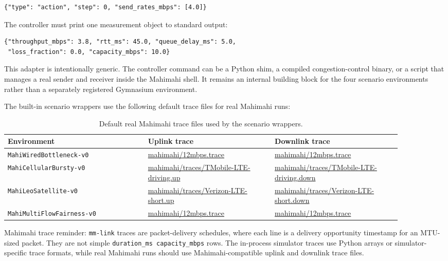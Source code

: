 \documentclass[11pt]{article}
\begin{document}
\begin{verbatim}
{"type": "action", "step": 0, "send_rates_mbps": [4.0]}
\end{verbatim}

The controller must print one measurement object to standard output:

\begin{verbatim}
{"throughput_mbps": 3.8, "rtt_ms": 45.0, "queue_delay_ms": 5.0,
 "loss_fraction": 0.0, "capacity_mbps": 10.0}
\end{verbatim}

This adapter is intentionally generic. The controller command can be a Python
shim, a compiled congestion-control binary, or a script that manages a real
sender and receiver inside the Mahimahi shell. It remains an internal building
block for the four scenario environments rather than a separately registered
Gymnasium environment.

The built-in scenario wrappers use the following default trace files for real
Mahimahi runs:

\begin{table}[h]
\centering
\small
\begin{tabular}{p{0.31\linewidth}p{0.29\linewidth}p{0.29\linewidth}}
\toprule
Environment & Uplink trace & Downlink trace \\
\midrule
\texttt{MahiWiredBottleneck-v0} & \url{mahimahi/12mbps.trace} & \url{mahimahi/12mbps.trace} \\
\texttt{MahiCellularBursty-v0} & \url{mahimahi/traces/TMobile-LTE-driving.up} & \url{mahimahi/traces/TMobile-LTE-driving.down} \\
\texttt{MahiLeoSatellite-v0} & \url{mahimahi/traces/Verizon-LTE-short.up} & \url{mahimahi/traces/Verizon-LTE-short.down} \\
\texttt{MahiMultiFlowFairness-v0} & \url{mahimahi/12mbps.trace} & \url{mahimahi/12mbps.trace} \\
\bottomrule
\end{tabular}
\caption{Default real Mahimahi trace files used by the scenario wrappers.}
\end{table}

Mahimahi trace reminder: \texttt{mm-link} traces are packet-delivery schedules,
where each line is a delivery opportunity timestamp for an MTU-sized packet.
They are not simple \texttt{duration\_ms capacity\_mbps} rows. The in-process
simulator traces use Python arrays or simulator-specific trace formats, while
real Mahimahi runs should use Mahimahi-compatible uplink and downlink trace
files.
\end{document}
